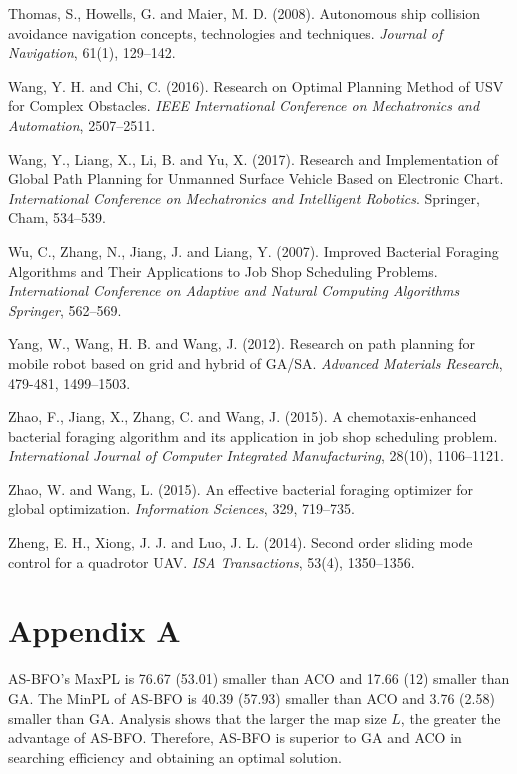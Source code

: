\documentclass{PDS}%
\theoremstyle{definition}
\begin{document}
\begin{Backmatter}
\begin{thebibliography}{}
{Thomas, S., Howells, G. and Maier, M. D.} ({2008}).
Autonomous ship collision avoidance navigation concepts, technologies and techniques.
\textit{Journal of Navigation}, {61}(1), 129--142.

{Wang, Y. H. and Chi, C.} ({2016}).
Research on Optimal Planning Method of USV for Complex Obstacles. \textit{IEEE International Conference on Mechatronics and Automation},
2507--2511.

{Wang, Y., Liang, X., Li, B. and Yu, X. } ({2017}).
Research and Implementation of Global Path Planning for Unmanned Surface Vehicle Based on Electronic Chart.
\textit{International Conference on Mechatronics and Intelligent Robotics}. Springer, Cham, 534--539.

{Wu, C., Zhang, N., Jiang, J. and Liang, Y.} ({2007}).
Improved Bacterial Foraging Algorithms and Their Applications to Job Shop Scheduling Problems.
\textit{International Conference on Adaptive and Natural Computing Algorithms Springer}, 562--569.

{Yang, W., Wang, H. B. and Wang, J.} ({2012}). Research on path planning for mobile robot based on grid and hybrid of GA/SA.
\textit{Advanced Materials Research},
479-481, 1499--1503.

{Zhao, F., Jiang, X., Zhang, C. and Wang, J.} (2015).
A chemotaxis-enhanced bacterial foraging algorithm and its application in job shop scheduling problem.
\textit{International Journal of Computer Integrated Manufacturing},
{28}(10), 1106--1121.

{Zhao, W. and Wang, L.} ({2015}).
An effective bacterial foraging optimizer for global optimization.
\textit{Information Sciences}, {329}, 719--735.

{Zheng, E. H., Xiong, J. J. and Luo, J. L.} ({2014}).
Second order sliding mode control for a quadrotor UAV.
\textit{ISA Transactions}, {53}(4), 1350--1356.

\end{thebibliography}


\appendix

\section*{\color{dscolor}Appendix A}

AS-BFO's MaxPL is 76{.}67 (53{.}01) smaller
than ACO and 17{.}66 (12) smaller than GA. The MinPL of AS-BFO is 40{.}39 (57{.}93) smaller
than ACO and 3{.}76 (2{.}58) smaller than GA. Analysis shows that the larger the map size $L$,
the greater the advantage of AS-BFO. Therefore, AS-BFO is superior to GA and ACO in
searching efficiency and obtaining an optimal solution.

\end{Backmatter}
\end{document}
